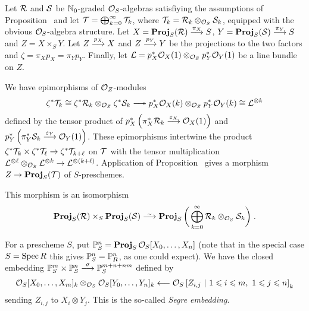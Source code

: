 \documentclass[a4paper,parskip=half,numbers=enddot, DIV=12]{scrreprt}
\renewcommand{\leq}{\leqslant}
\begin{document}
Let $\mathcal{R}$ and $\mathcal{S}$ be $\mathbb{N}_0$-graded $\mathcal{O}_S$-algebras satisfiying the assumptions of Proposition~ and let $\mathcal{T}=\bigoplus_{k=0}^\infty\mathcal{T}_k$, where $\mathcal{T}_k=\mathcal{R}_k\otimes_{\mathcal{O}_S}\mathcal{S}_k$, equipped with the obvious $\mathcal{O}_S$-algebra structure. Let $X=\PROJ_S(\Rr)\morphism[\pi_X]S$, $Y=\PROJ_S(\Ss)\morphism[\pi_Y]S$ and $Z=X\times_SY$. Let $Z\morphism[p_X]X$ and $Z\morphism[p_Y]Y$ be the projections to the two factors and $\zeta=\pi_Xp_X=\pi_Yp_Y$. Finally, let $\mathcal{L}=p_X^*\mathcal{O}_X(1)\otimes_{\mathcal{O}_Z}p_Y^*\mathcal{O}_Y(1)$ be a line bundle on $Z$.

We have epimorphisms of $\mathcal{O}_Z$-modules
\begin{align*}
	\zeta^*\Tt_k\cong \zeta^*\Rr_k\otimes_{\Oo_Z}\zeta^*\Ss_k\epimorphism p_X^*\Oo_X(k)\otimes_{\Oo_Z}p_Y^*\Oo_Y(k)\cong\Ll^{\otimes k}
\end{align*}
defined by the tensor product of $p_X^*\left(\pi_X^*\Rr_k\morphism[\epsilon_X]\Oo_X(1)\right)$ and $p_Y^*\left(\pi_Y^*\Ss_k\morphism[\epsilon_Y]\Oo_Y(1)\right)$. These epimorphisms intertwine the product $\zeta^*\Tt_k\times \zeta^*\Tt_\ell\morphism \zeta^*\Tt_{k+\ell}$ on $\mathcal{T}$ with the tensor multiplication $\Ll^{\otimes \ell}\otimes_{\Oo_S}\Ll^{\otimes k}\morphism\Ll^{\otimes(k+\ell)}$. Application of Proposition~ gives a morphism $Z\morphism\PROJ_S(\Tt)$ of $S$-preschemes. 
\begin{prop}
	This morphism is an isomorphism
	\begin{align*}
		\PROJ_S(\Rr)\times_S\PROJ_S(\Ss)\isomorphism\PROJ_S\bigg(\bigoplus_{k=0}^\infty \Rr_k\otimes_{\Oo_S}\Ss_k\bigg)\;.
	\end{align*}
\end{prop}
\begin{example}
	For a prescheme $S$, put $\mathbb{P}_S^n=\operatorname{\mathbf{Proj}}_S\mathcal{O}_S[X_0,\ldots,X_n]$ (note that in the special case $S=\operatorname{Spec} R$ this gives $\mathbb{P}_S^n=\mathbb{P}_R^n$, as one could expect). We have the closed embedding $\IP_S^m\times\IP_S^n\morphism[\sigma]\IP_S^{m+n+nm}$ defined by 
	\begin{align*}
		\Oo_S[X_0,\ldots,X_m]_k\otimes_{\Oo_S}\Oo_S[Y_0,\ldots,Y_n]_k\lmorphism \Oo_S\left[Z_{i,j}\st 1\leq i\leq m,\ 1\leq j\leq n\right]_k
	\end{align*}
	sending $Z_{i,j}$ to $X_i\otimes Y_j$. This is the so-called \emph{Segre embedding}.
\end{example}
\end{document}

